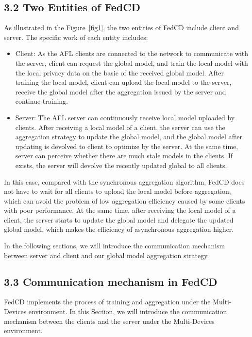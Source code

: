 \documentclass[twoside,twocolumn]{article}
\begin{document}
\begin{spacing}{1.0}
\subsection{3.2 Two Entities of FedCD}

	As illustrated in the Figure~\ref{fig1}, the two entities of FedCD include client and server. The specific work of each entity includes:
%
\begin{itemize}
	\item Client: As the AFL clients are connected to the network to communicate with the server, client can request the global model, and  train the local model with the local privacy data on the basic of the received global model. After training the local model, client can upload the local model to the server, receive the global model after the aggregation issued by the server and continue training.
%
	\item Server: The AFL server can continuously receive local model uploaded by clients. After receiving a local model of a client, the server can use the aggregation strategy to update the global model, and the global model after updating is devolved to client to optimize by the server. At the same time, server can perceive whether there are much stale models in the clients. If exists, the server will devolve the recently updated global to all clients.
\end{itemize}
%

	In this case, compared with the synchronous aggregation algorithm, FedCD does not have to wait for all clients to upload the local model before aggregation, which can avoid the problem of low aggregation efficiency caused by some clients with poor performance. At the same time, after receiving the local model of a client, the server starts to update the global model and delegate the updated global model, which makes the efficiency of asynchronous aggregation higher.

	In the following sections, we will introduce the communication mechanism between server and client and our global model aggregation strategy.
%
\subsection{3.3 Communication mechanism in FedCD}

	FedCD implements the process of training and aggregation under the Multi-Devices environment. In this Section, we will introduce the communication mechanism between the clients and the server under the Multi-Devices environment.


\end{spacing}
\end{document}
